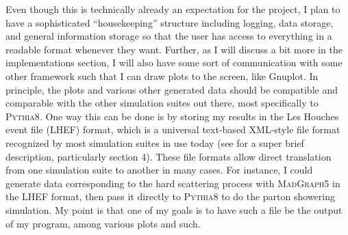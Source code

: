 Even though this is technically already an expectation for the project, I plan to have a sophisticated ``housekeeping'' structure including logging, data storage, and general information storage so that the user has access to everything in a readable format whenever they want. Further, as I will discuss a bit more in the implementations section, I will also have some sort of communication with some other framework such that I can draw plots to the screen, like Gnuplot. In principle, the plots and various other generated data should be compatible and comparable with the other simulation suites out there, most specifically to \textsc{Pythia8}. One way this can be done is by storing my results in the Les Houches event file (LHEF) format, which is a universal text-based XML-style file format recognized by most simulation suites in use today (see \cite{LHEFFORMAT} for a super brief description, particularly section 4). These file formats allow direct translation from one simulation suite to another in many cases. For instance, I could generate data corresponding to the hard scattering process with \textsc{MadGraph5} in the LHEF format, then pass it directly to \textsc{Pythia8} to do the parton showering simulation. My point is that one of my goals is to have such a file be the output of my program, among various plots and such.



